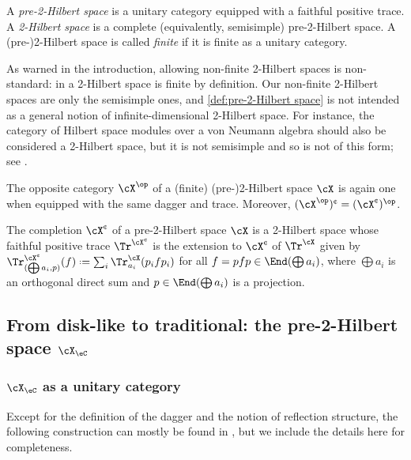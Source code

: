\documentclass[12pt,reqno]{amsart}
\newcommand{\defn}[1]{\emph{#1}}
\newcommand{\cent}{\textup{\textcent}}
\DeclareRobustCommand{\coloneq}{\mathrel{\vcenter{\baselineskip0.5ex\lineskiplimit0pt\hbox{\scriptsize{\upshape.}}\hbox{\scriptsize{\upshape.}}}}=}
\begin{document}
\begin{definition}
  \label{def:pre-2-Hilbert space}
  A \defn{pre-2-Hilbert space} is a unitary category equipped with a faithful positive trace. A \defn{2-Hilbert space} is a complete (equivalently, semisimple) pre-2-Hilbert space. A (pre-)2-Hilbert space is called \defn{finite} if it is finite as a unitary category.
\end{definition}

\begin{remark}
\label{rem:2Hilb-nonstandard}
As warned in the introduction, allowing non-finite 2-Hilbert spaces is non-standard: in \cite{Baez97,3Hilb,bases} a 2-Hilbert space is finite by definition. Our non-finite 2-Hilbert spaces are only the semisimple ones, and \cref{def:pre-2-Hilbert space} is not intended as a general notion of infinite-dimensional 2-Hilbert space. For instance, the category of Hilbert space modules over a von Neumann algebra should also be considered a 2-Hilbert space, but it is not semisimple and so is not of this form; see \cite{HPT24}.
\end{remark}


The opposite category $\cX^\op$ of a (finite) (pre-)2-Hilbert space $\cX$ is again one when equipped with the same dagger and trace. Moreover, $(\cX^\op)^\cent=(\cX^\cent)^\op$.

\begin{remark}
\label{trcomp}
The completion $\cX^\cent$ of a pre-2-Hilbert space $\cX$ is a 2-Hilbert space whose faithful positive trace $\Tr^{\cX^\cent}$ is the extension to $\cX^\cent$ of $\Tr^\cX$ given by $\Tr^{\cX^\cent}_{(\bigoplus a_{i},p)}(f)\coloneq\sum_{i} \Tr^\cX_{a_{i}}(p_{i}fp_{i})$ for all $f = pfp \in \End(\bigoplus a_{i})$, where $\bigoplus a_{i}$ is an orthogonal direct sum and $p \in \End(\bigoplus a_{i})$ is a projection.
\end{remark}

\subsection{From disk-like to traditional: the pre-2-Hilbert space \texorpdfstring{$\cX_\eC$}{X(C)}}

\subsubsection{\texorpdfstring{$\cX_\eC$}{X(C)} as a unitary category}
Except for the definition of the dagger and the notion of reflection structure, the following construction can mostly be found in \cite[Appendix C.1]{MW12}, but we include the details here for completeness.
\end{document}
